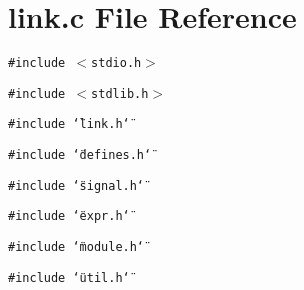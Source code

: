 \section{link.c File Reference}
\label{link_8c}
{\tt \#include $<$stdio.h$>$}\par
{\tt \#include $<$stdlib.h$>$}\par
{\tt \#include \char`\"{}link.h\char`\"{}}\par
{\tt \#include \char`\"{}defines.h\char`\"{}}\par
{\tt \#include \char`\"{}signal.h\char`\"{}}\par
{\tt \#include \char`\"{}expr.h\char`\"{}}\par
{\tt \#include \char`\"{}module.h\char`\"{}}\par
{\tt \#include \char`\"{}util.h\char`\"{}}\par

